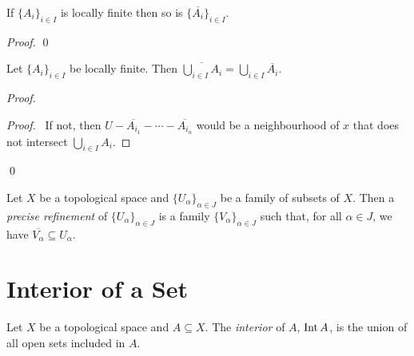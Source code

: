\begin{lm}
  \label{lm:topology:closure:locally_finite}
  If $\{ A_i \}_{i \in I}$ is locally finite then so is $\{ \overline{A_i} \}_{i \in I}$.
\end{lm}

\begin{proof}
  \pf
  \qed
\end{proof}

\begin{lm}
  \label{lm:topology:closure:locally_finite_union}
  Let $\{ A_i \}_{i \in I}$ be locally finite. Then $\overline{\bigcup_{i \in I} A_i} = \bigcup_{i \in I} \overline{A_i}$.
\end{lm}

\begin{proof}
  \pf
  \begin{proof}
    \pf\ If not, then $U - \overline{A_{i_1}} - \cdots - \overline{A_{i_n}}$ would be a neighbourhood of $x$ that does not intersect $\bigcup_{i \in I} A_i$.
  \end{proof}
  \qed
\end{proof}

\begin{df}
  Let $X$ be a topological space and $\{ U_\alpha \}_{\alpha \in J}$ be a family of subsets of $X$. Then a \emph{precise refinement} of $\{ U_\alpha \}_{\alpha \in J}$ is a family $\{ V_\alpha \}_{\alpha \in J}$ such that, for all $\alpha \in J$, we have $\overline{V_\alpha} \subseteq U_\alpha$.
\end{df}

\section{Interior of a Set}

\begin{df}[Interior]
  Let $X$ be a topological space and $A \subseteq X$.
  The \emph{interior} of $A$, $\operatorname{Int} A$, is the union of all open sets
  included
  in $A$.
\end{df}

